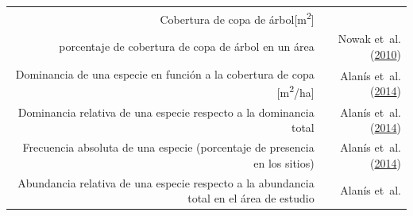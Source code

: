 \documentclass[12pt,a4paper,oneside, openany]{book}
\theoremstyle{definition}
\theoremstyle{definition}
\theoremstyle{definition}
\theoremstyle{remark}
\begin{document}
\begin{longtable}[]{@{}rr@{}}
\begin{minipage}[t]{0.57\columnwidth}\raggedleft\strut
Cobertura de copa de árbol{[}m\textsuperscript{2}{]}\strut
\end{minipage} & \begin{minipage}[t]{0.31\columnwidth}\raggedleft\strut
\strut
\end{minipage}\tabularnewline
\begin{minipage}[t]{0.57\columnwidth}\raggedleft\strut
porcentaje de cobertura de copa de árbol en un área\strut
\end{minipage} & \begin{minipage}[t]{0.31\columnwidth}\raggedleft\strut
Nowak et~al. (\protect\hyperlink{ref-nowak_sustaining_2010}{2010})\strut
\end{minipage}\tabularnewline
\begin{minipage}[t]{0.57\columnwidth}\raggedleft\strut
Dominancia de una especie en función a la cobertura de copa
{[}m\textsuperscript{2}/ha{]}\strut
\end{minipage} & \begin{minipage}[t]{0.31\columnwidth}\raggedleft\strut
Alanís et~al.
(\protect\hyperlink{ref-alanis_estructura_2014}{2014})\strut
\end{minipage}\tabularnewline
\begin{minipage}[t]{0.57\columnwidth}\raggedleft\strut
Dominancia relativa de una especie respecto a la dominancia total\strut
\end{minipage} & \begin{minipage}[t]{0.31\columnwidth}\raggedleft\strut
Alanís et~al.
(\protect\hyperlink{ref-alanis_estructura_2014}{2014})\strut
\end{minipage}\tabularnewline
\begin{minipage}[t]{0.57\columnwidth}\raggedleft\strut
Frecuencia absoluta de una especie (porcentaje de presencia en los
sitios)\strut
\end{minipage} & \begin{minipage}[t]{0.31\columnwidth}\raggedleft\strut
Alanís et~al.
(\protect\hyperlink{ref-alanis_estructura_2014}{2014})\strut
\end{minipage}\tabularnewline
\begin{minipage}[t]{0.57\columnwidth}\raggedleft\strut
Abundancia relativa de una especie respecto a la abundancia total en el
área de estudio\strut
\end{minipage} & \begin{minipage}[t]{0.31\columnwidth}\raggedleft\strut
Alanís et~al.

\end{minipage}
\end{longtable}
\end{document}
